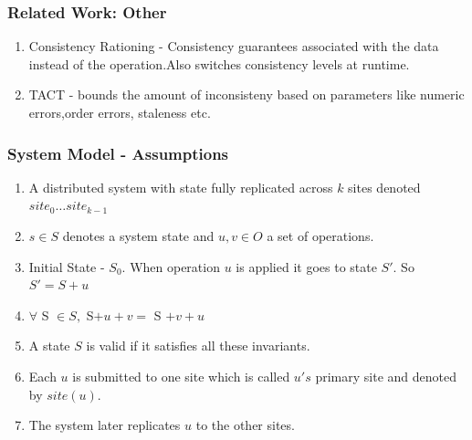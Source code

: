 \documentclass{beamer}
\begin{document}

\begin{frame}
\frametitle{Related Work: Other}
\begin{enumerate}
\item Consistency Rationing - Consistency guarantees associated with the data instead of the operation.Also switches consistency levels at runtime.
\item TACT - bounds the amount of inconsisteny based on parameters like numeric errors,order errors, staleness etc.
\end{enumerate}

\end{frame}



\begin{frame}
\frametitle{System Model - Assumptions}
\begin{enumerate}
\item A distributed system with state fully replicated across $k$ sites denoted $site_0 \ldots site_{k-1}$
\item $s \in S$ denotes a system state and $u,v \in O$ a set of operations. 
\item Initial State - $S_0$. When operation $u$ is applied it goes to state $S'$. So $S' = S + u$
\item $ \forall$ S $\in S,$ S$+u+v = $ S $+v+u$
\item A state $S$ is valid if it satisfies all these invariants.
\item Each $u$ is submitted to one site which is called $u's$ primary site and denoted by $site(u)$.
\item The system later replicates $u$ to the other sites.
\end{enumerate}

\end{frame}

\end{document}
